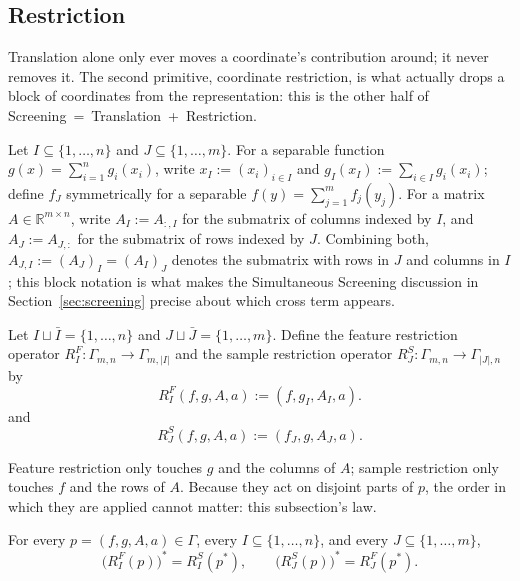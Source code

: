 







\subsection{Restriction}

Translation alone only ever moves a coordinate's contribution around;
it never removes it. The second primitive, coordinate restriction, is
what actually drops a block of coordinates from the representation:
this is the other half of Screening~=~Translation~+~Restriction.


Let \(I\subseteq\{1,\ldots,n\}\) and \(J\subseteq\{1,\ldots,m\}\). For a
separable function \(g(x)=\sum_{i=1}^n g_i(x_i)\), write
\(x_I:=(x_i)_{i\in I}\) and \(g_I(x_I):=\sum_{i\in I}g_i(x_i)\); define
\(f_J\) symmetrically for a separable \(f(y)=\sum_{j=1}^m f_j(y_j)\).
For a matrix \(A\in\mathbb R^{m\times n}\), write \(A_I:=A_{:,I}\) for
the submatrix of columns indexed by \(I\), and \(A_J:=A_{J,:}\) for the
submatrix of rows indexed by \(J\). Combining both,
\(A_{J,I}:=(A_J)_I=(A_I)_J\) denotes the submatrix with rows in \(J\)
and columns in \(I\); this block notation is what makes the
Simultaneous Screening discussion in Section~\ref{sec:screening}
precise about which cross term appears.

\begin{definition}
Let \(I\sqcup\bar I=\{1,\ldots,n\}\) and \(J\sqcup\bar J=\{1,\ldots,m\}\). Define the feature restriction operator $R^{F}_I:\Gamma_{m,n}\to\Gamma_{m,|I|}$ and the sample restriction operator \(R^{S}_J:\Gamma_{m,n}\to\Gamma_{|J|,n}\) by
\[
R^{F}_I(f,g,A,a)
:=
(f,g_I,A_I,a).
\]
and 
\[
R^{S}_J(f,g,A,a)
:=
(f_J,g,A_J,a).
\]
\end{definition}

Feature restriction only touches \(g\) and the columns of \(A\); sample
restriction only touches \(f\) and the rows of \(A\). Because they act
on disjoint parts of \(p\), the order in which they are applied cannot
matter: this subsection's law.


\begin{proposition}
\label{prop:restriction-equivariance}
For every \(p=(f,g,A,a)\in\Gamma\), every \(I\subseteq\{1,\ldots,n\}\),
and every \(J\subseteq\{1,\ldots,m\}\),
\[
\bigl(R^{F}_I(p)\bigr)^*=R^{S}_I(p^*),
\qquad
\bigl(R^{S}_J(p)\bigr)^*=R^{F}_J(p^*).
\]
\end{proposition}

